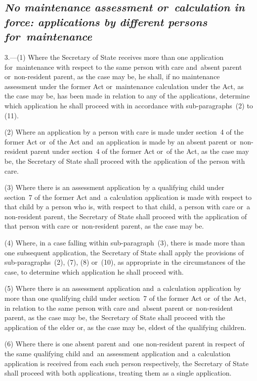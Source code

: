 \documentclass[12pt,a4paper]{article}
\begin{document}
\subsection*{\itshape No maintenance assessment or~calculation in force: applications by different persons for~maintenance}

3.---(1)  Where the Secretary of State receives more than one application for~maintenance with respect to the same person with care and~absent parent or~non-resident parent, as the case may be, he shall, if no maintenance assessment under the former Act or~maintenance calculation under the Act, as the case may be, has been made in relation to any of the applications, determine which application he shall proceed with in accordance with sub-paragraphs~(2) to (11).

(2) Where an application by a person with care is made under section~4 of the former Act or~of the Act
and~an application is made by an absent parent or~non-resident parent under section~4 of the former Act or~of the Act, as the case may be, the Secretary of State shall proceed with the application of the person with care.

(3) Where there is an assessment application by a qualifying child under section~7 of the former Act and~a calculation application is made with respect to that child by a person who is, with respect to that child, a person with care or~a non-resident parent, the Secretary of State shall proceed with the application of that person with care or~non-resident parent, as the case may be.

(4) Where, in a case falling within sub-paragraph~(3), there is made more than one subsequent application, the Secretary of State shall apply the provisions of sub-paragraphs~(2), (7), (8) or~(10), as appropriate in the circumstances of the case, to determine which application he shall proceed with.

(5) Where there is an assessment application and~a calculation application by more than one qualifying child under section~7 of the former Act or~of the Act, in relation to the same person with care and~absent parent or~non-resident parent, as the case may be, the Secretary of State shall proceed with the application of the elder or, as the case may be, eldest of the qualifying children.

(6) Where there is one absent parent and~one non-resident parent in respect of the same qualifying child and~an assessment application and~a calculation application is received from each such person respectively, the Secretary of State shall proceed with both applications, treating them as a single application.
\end{document}
